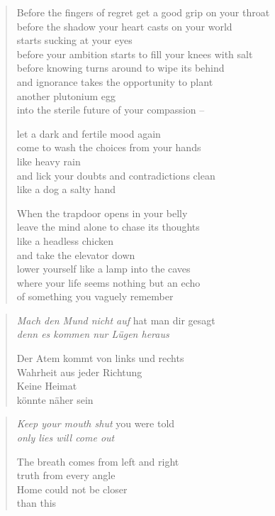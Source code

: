 \begin{verse}

Before the fingers of regret get a good grip on your throat\\
before the shadow your heart casts on your world\\
starts sucking at your eyes\\
before your ambition starts to fill your knees with salt\\
before knowing turns around to wipe its behind\\
and ignorance takes the opportunity to plant\\
another plutonium egg\\
into the sterile future of your compassion --

let a dark and fertile mood again\\
come to wash the choices from your hands\\
like heavy rain\\
and lick your doubts and contradictions clean\\
like a dog a salty hand

When the trapdoor opens in your belly\\
leave the mind alone to chase its thoughts\\
like a headless chicken\\
and take the elevator down\\
lower yourself like a lamp into the caves\\
where your life seems nothing but an echo\\
of something you vaguely remember

\end{verse}

\clearpage

\begin{verse}

\emph{Mach den Mund nicht auf} hat man dir gesagt\\
\emph{denn es kommen nur Lügen heraus}

Der Atem kommt von links und rechts\\
Wahrheit aus jeder Richtung\\
Keine Heimat\\
könnte näher sein

\end{verse}

\clearpage

\begin{verse}
\emph{Keep your mouth shut} you were told\\
\emph{only lies will come out}

The breath comes from left and right\\
truth from every angle\\
Home could not be closer\\
than this

\end{verse}

\restoregeometry

